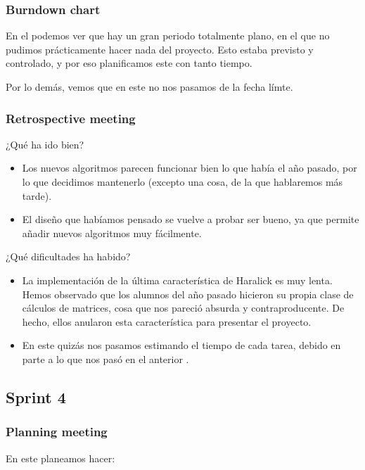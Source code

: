 \subsubsection*{Burndown chart}
En el \burndownchart{}  podemos ver que hay un gran periodo totalmente plano, en el que no pudimos prácticamente hacer nada del proyecto. Esto estaba previsto y controlado, y por eso planificamos este \sprint{} con tanto tiempo.


Por lo demás, vemos que en este \sprint{} no nos pasamos de la fecha límte.

\subsubsection*{Retrospective meeting}
¿Qué ha ido bien?
\begin{itemize}
 \item Los nuevos algoritmos parecen funcionar bien lo que había el año pasado, por lo que decidimos mantenerlo (excepto una cosa, de la que hablaremos más tarde).
 \item El diseño que habíamos pensado se vuelve a probar ser bueno, ya que permite añadir nuevos algoritmos muy fácilmente.
\end{itemize}

¿Qué dificultades ha habido?
\begin{itemize}
 \item La implementación de la última característica de Haralick es muy lenta. Hemos observado que los alumnos del año pasado hicieron su propia clase de cálculos de matrices, cosa que nos pareció absurda y contraproducente. De hecho, ellos anularon esta característica para presentar el proyecto.
 \item En este \sprint{} quizás nos pasamos estimando el tiempo de cada tarea, debido en parte a lo que nos pasó en el anterior \sprint{}.
\end{itemize}


\subsection{Sprint 4}
\subsubsection*{Planning meeting}
En este \sprint{} planeamos hacer:

